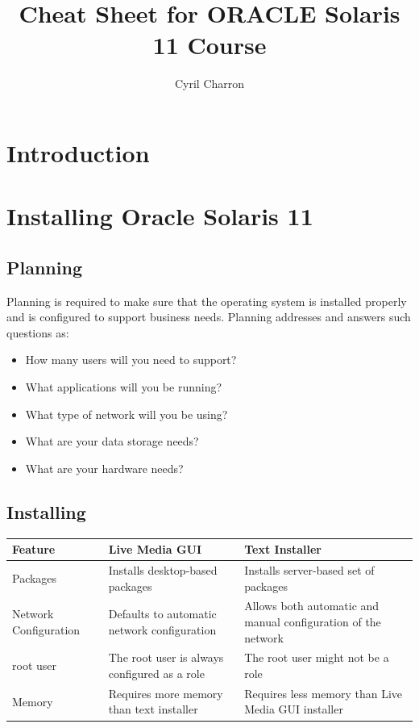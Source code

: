 \documentclass[10pt,a4paper,twoside]{report}
\author{Cyril Charron}
\title{Cheat Sheet for ORACLE Solaris 11 Course}
\begin{document}
\maketitle
\chapter{Introduction}
\chapter{Installing Oracle Solaris 11}
\section{Planning}
Planning is required to make sure that the operating system is installed properly and is configured to support business needs.
Planning addresses and answers such questions as:
\begin{itemize}
\item How many users will you need to support?
\item What applications will you be running?
\item What type of network will you be using?
\item What are your data storage needs?
\item What are your hardware needs?
\end{itemize}
\section{Installing}
\begin{table}
\begin{tabular}{|p{}|p{}|p{}|}
\hline
\rowcolor{LightBlue}
\textbf{Feature} & \textbf{Live Media GUI} & \textbf{Text Installer}\\
\hline
\rowcolor{LightYellow}
Packages & Installs desktop-based packages & Installs server-based set of packages\\
\hline
\rowcolor{LightYellow}
Network Configuration & Defaults to automatic network configuration & Allows both automatic and manual configuration of the network \\
\hline
\rowcolor{LightYellow}
root user & The root user is always configured as a role & The root user might not be a role \\
\hline
\rowcolor{LightYellow}
Memory & Requires more memory than text installer & Requires less memory than Live Media GUI installer\\
\hline
\end{tabular}
\end{table}
\end{document}
